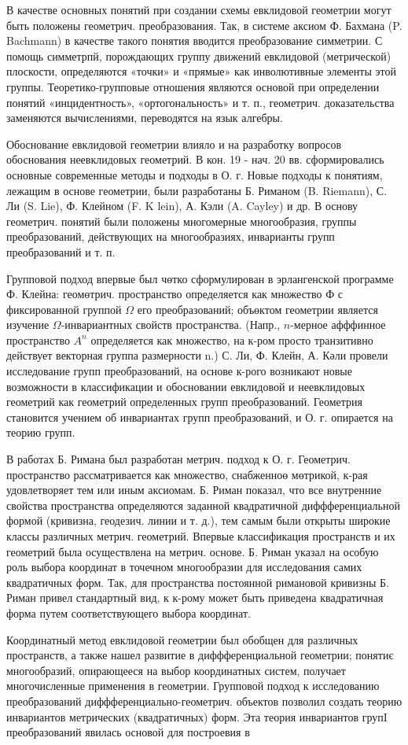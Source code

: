 \documentclass[10pt]{article}
\begin{document}
В качестве основных понятий при создании схемы евклидовой геометрии могут быть положены геометрич. преобразования. Так, в системе аксиом Ф. Бахмана (P. Bachmann) в качестве такого понятия вводится преобразование симметрии. С помощь симметрпй, порождающих группу движений евклидовой (метрической) плоскости, определяются «точки» и «прямые» как инволютивные элементы этой группы. Теоретико-групповые отношения являются основой при определении понятий «инцидентность», «ортогональность» и т. п., геометрич. доказательства заменяются вычислениями, переводятся на язык алгебры.

Обоснование евклидовой геометрии влияло и на разработку вопросов обоснования неевклидовых геометрий. В кон. 19 - нач. 20 вв. сформировались основные современные методы и подходы в О. г. Новые подходы к понятиям, лежащим в основе геометрии, были разработаны Б. Риманом (B. Riemann), С. Ли (S. Lie), Ф. Клейном (F. K lein), А. Кэли (A. Cayley) и др. В основу геометрич. понятий были положены многомерные многообразия, группы преобразований, действующих на многообразиях, инварианты групп преобразований и т. п.

Групповой подход впервые был чөтко сформулирован в эрлангенской программе Ф. Клейна: геомөтрич. пространство определяется как множество Ф с фиксированной группой $\Omega$ его преобразований; объөктом геометрии является изучение $\Omega$-инвариантных свойств пространства. (Напр., $n$-мерное афффинное пространство $A^{n}$ определяется как множество, на к-ром просто транзитивно действует векторная группа размерности n.) С. Ли, Ф. Клейн, А. Кәли провели исследование групп преобразований, на основе к-рого возникают новые возможности в классификации и обосновании евклидовой и неевклидовых геометрий как геометрий определенных групп преобразований. Геометрия становится учением об инвариантах групп преобразований, и О. г. опирается на теорию групп.

В работах Б. Римана был разработан метрич. подход к О. г. Геометрич. пространство рассматривается как множество, снабженноө мөтрикой, к-рая удовлетворяет тем или иным аксиомам. Б. Риман показал, что все внутренние свойства пространства определяются заданной квадратичной диффференциальной формой (кривизна, геодезич. линии и т. д.), тем самым были открыты широкие классы различных метрич. геометрий. Впервые классификация пространств и их геометрий была осуществлена на метрич. основе. Б. Риман указал на особую роль выбора координат в точечном многообразии для исследования самих квадратичных форм. Так, для пространства постоянной римановой кривизны Б. Риман привел стандартный вид, к к-рому может быть приведена квадратичная форма путем соответствующего выбора координат.

Координатный метод евклидовой геометрии был обобщен для различных пространств, а также нашел развитие в диффференциальной геометрии; понятиє многообразий, опирающееся на выбор координатных систем, получает многочисленные применения в геометрии. Групповой подход к исследованию преобразований диффференциально-геометрич. объектов позволил создать теорию инвариантов метрических (квадратичных) форм. Эта теория инвариантов групI преобразований явилась основой для построевия в
\end{document}
